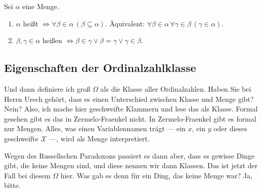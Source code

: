 \begin{math-stroke}[Ordinalzahlen]
Sei $\alpha$ eine Menge.
\begin{enumerate}[label=\textbf{(\roman*)}]
    \item $\alpha$ heißt  $\iff \forall \beta \in \alpha \, (\beta \subseteq \alpha)$.
    Äquivalent: $\forall \beta \in \alpha \, \forall \gamma \in \beta \, (\gamma \in \alpha)$.
    \item $\beta, \gamma \in \alpha$ heißen  $\iff \beta \in \gamma \lor \beta = \gamma \lor \gamma \in \beta$.
\end{enumerate}

\end{math-stroke}

\subsection{Eigenschaften der Ordinalzahlklasse}

\begin{spoken-clean}[00:30:10 - 00:31:29]
Und dann definiere ich groß $\Omega$ als die Klasse aller Ordinalzahlen. Haben Sie bei Herrn Urech gehört, dass es einen Unterschied zwischen Klasse und Menge gibt? Nein? Also, ich mache hier geschweifte Klammern und lese das als Klasse. Formal gesehen gibt es das in Zermelo-Fraenkel nicht. In Zermelo-Fraenkel gibt es formal nur Mengen. Alles, was einen Variablennamen trägt --- ein $x$, ein $y$ oder dieses geschweifte $\mathcal{X}$ ---, wird als Menge interpretiert.

Wegen des Russellschen Paradoxons passiert es dann aber, dass es gewisse Dinge gibt, die keine Mengen sind, und diese nennen wir dann Klassen. Das ist jetzt der Fall bei diesem $\Omega$ hier. Was gab es denn für ein Ding, das keine Menge war? Ja, bitte.
\end{spoken-clean}


